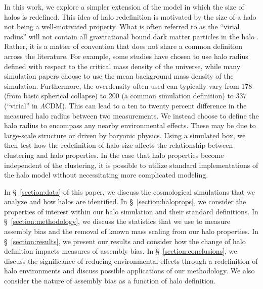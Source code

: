 \documentclass[usenatbib,usegraphicx,letterpaper]{mn2e}
\begin{document}
In this work, we explore a simpler extension of the model in which the size of halos is redefined. This idea of
halo redefinition is motivated by the size of a halo not being a well-motivated property. What is often referred
to as the ``virial radius'' will not contain all gravitational bound dark matter particles in the halo
\citep{kazan06}. Rather, it is a matter of convention that does not share a common definition across the
literature. For example, some studies have chosen to use halo radius defined with respect to the critical mass
density of the universe, while many simulation papers choose to use the mean background mass density of the
simulation.  Furthermore, the overdensity often used can typically vary from 178 (from basic spherical collapse) to
200 (a common simulation definition) to 337 (``virial'' in $\Lambda\mathrm{CDM}$). This can lead to a ten to
twenty percent difference in the measured halo radius between two measurements. We instead choose to define the
halo radius to encompass any nearby environmental effects. These may be due to large-scale structure or driven by
baryonic physics. Using a simulated box, we then test how the redefinition of halo size affects the relationship
between clustering and halo properties. In the case that halo properties become independent of the clustering, it
is possible to utilize standard implementations of the halo model without necessitating more complicated
modeling.
 
In \S~\ref{section:data} of this paper, we discuss the cosmological simulations that we analyze and how halos are
identified. In \S~\ref{section:haloprops}, we consider the properties of interest within our halo simulation and
their standard definitions. In \S~\ref{section:methodology}, we discuss the statistics that we use to measure
assembly bias and the removal of known mass scaling from our halo properties. In \S~\ref{section:results}, we
present our results and consider how the change of halo definition impacts measures of assembly bias. In
\S~\ref{section:conclusions}, we discuss the significance of reducing environmental effects through a
redefinition of halo environments and discuss possible applications of our methodology. We also consider the
nature of assembly bias as a function of halo definition.

\end{document}
